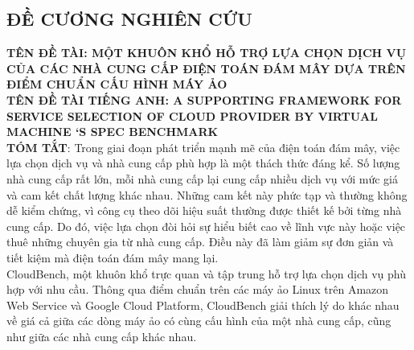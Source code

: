 \documentclass{article}
\begin{document}
\begin{center}
    \section*{ĐỀ CƯƠNG NGHIÊN CỨU}
\end{center}

\textbf{TÊN ĐỀ TÀI: MỘT KHUÔN KHỔ HỖ TRỢ LỰA CHỌN DỊCH VỤ CỦA CÁC NHÀ CUNG CẤP ĐIỆN TOÁN ĐÁM MÂY DỰA TRÊN ĐIỂM CHUẨN CẤU HÌNH MÁY ẢO} \\

\textbf{TÊN ĐỀ TÀI TIẾNG ANH: A SUPPORTING FRAMEWORK FOR SERVICE SELECTION OF CLOUD PROVIDER BY VIRTUAL MACHINE ‘S SPEC BENCHMARK} \\

\textbf{TÓM TẮT}: Trong giai đoạn phát triển mạnh mẽ của điện toán đám mây, việc lựa chọn dịch vụ và nhà cung cấp phù hợp là một thách thức đáng kể. Số lượng nhà cung cấp rất lớn, mỗi nhà cung cấp lại cung cấp nhiều dịch vụ với mức giá và cam kết chất lượng khác nhau. Những cam kết này phức tạp và thường không dễ kiểm chứng, vì công cụ theo dõi hiệu suất thường được thiết kế bởi từng nhà cung cấp. Do đó, việc lựa chọn đòi hỏi sự hiểu biết cao về lĩnh vực này hoặc việc thuê những chuyên gia từ nhà cung cấp. Điều này đã làm giảm sự đơn giản và tiết kiệm mà điện toán đám mây mang lại. \\

CloudBench, một khuôn khổ trực quan và tập trung hỗ trợ lựa chọn dịch vụ phù hợp với nhu cầu. Thông qua điểm chuẩn trên các máy ảo Linux trên Amazon Web Service và Google Cloud Platform, CloudBench giải thích lý do khác nhau về giá cả giữa các dòng máy ảo có cùng cấu hình của một nhà cung cấp, cũng như  giữa các nhà cung cấp khác nhau. 
\end{document}
